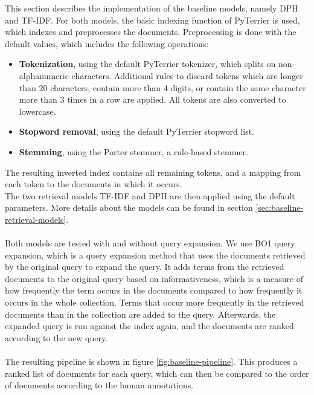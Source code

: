 This section describes the implementation of the baseline models, namely DPH and TF-IDF.
For both models, the basic indexing function of PyTerrier is used, which indexes and preprocesses the documents.
Preprocessing is done with the default values, which includes the following operations:
\begin{itemize}
    \item{\textbf{Tokenization}, using the default PyTerrier tokenizer, which splits on non-alphanumeric characters. Additional rules to discard tokens which are longer than 20 characters, contain more than 4 digits, or contain the same character more than 3 times in a row are applied. All tokens are also converted to lowercase.}
    \item \textbf{Stopword removal}, using the default PyTerrier stopword list.
    \item \textbf{Stemming}, using the Porter stemmer, a rule-based stemmer.
\end{itemize}
The resulting inverted index contains all remaining tokens, and a mapping from each token to the documents in which it occurs.
\\
The two retrieval models TF-IDF and DPH are then applied using the default parameters.
More details about the models can be found in section \ref{sec:baseline-retrieval-models}.
\\
\\
Both models are tested with and without query expansion.
We use BO1 query expansion, which is a query expansion method that uses the documents retrieved by the original query to expand the query.
It adds terms from the retrieved documents to the original query based on informativeness, which is a measure of how frequently the term occurs in the documents compared to how frequently it occurs in the whole collection.
Terms that occur more frequently in the retrieved documents than in the collection are added to the query.
Afterwards, the expanded query is run against the index again, and the documents are ranked according to the new query.
\\
\\
The resulting pipeline is shown in figure \ref{fig:baseline-pipeline}.
This produces a ranked list of documents for each query, which can then be compared to the order of documents according to the human annotations.

